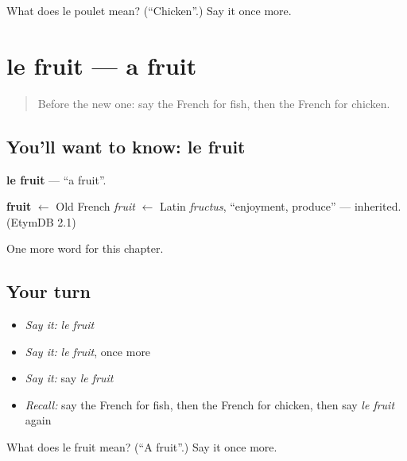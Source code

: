\begin{tcolorbox}[breakable,colback=teal!4,colframe=teal!35!black,title={Before you move on}]
What does le poulet mean? (\textquotedblleft{}Chicken\textquotedblright{}.) Say it once more.
\end{tcolorbox}
\section[le fruit]{le fruit — a fruit}

\label{lesson:FR-C67-fruit}



\begin{quote}
Before the new one: say the French for fish, then the French for chicken.
\end{quote}

\subsection*{You'll want to know: le fruit}
\textbf{le fruit} — \textquotedblleft{}a fruit\textquotedblright{}.

\begin{cousinweb}
\textbf{fruit} $\leftarrow$ Old French \emph{fruit} $\leftarrow$ Latin \emph{fructus}, \textquotedblleft{}enjoyment, produce\textquotedblright{} — inherited. (EtymDB 2.1)
\end{cousinweb}

\begin{grammarlens}[title={What you've built}]
One more word for this chapter.
\end{grammarlens}

\subsection*{Your turn}
\begin{itemize}
\raggedright
  \item \emph{Say it:} \emph{le fruit}
  \item \emph{Say it:} \emph{le fruit}, once more
  \item \emph{Say it:} say \emph{le fruit}
  \item \emph{Recall:} say the French for fish, then the French for chicken, then say \emph{le fruit} again
\end{itemize}

\begin{tcolorbox}[breakable,colback=teal!4,colframe=teal!35!black,title={Before you move on}]
What does le fruit mean? (\textquotedblleft{}A fruit\textquotedblright{}.) Say it once more.
\end{tcolorbox}
